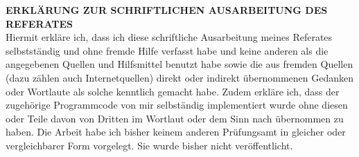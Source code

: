 \clearpage
\thispagestyle{plain}
\textbf{ERKLÄRUNG ZUR SCHRIFTLICHEN AUSARBEITUNG DES REFERATES} \\
Hiermit erkläre ich, dass ich diese schriftliche Ausarbeitung meines Referates selbstständig und ohne fremde Hilfe verfasst habe und keine anderen als die angegebenen Quellen und Hilfsmittel benutzt habe sowie die aus fremden Quellen (dazu zählen auch Internetquellen) direkt oder indirekt übernommenen Gedanken oder Wortlaute als solche kenntlich gemacht habe. Zudem erkläre ich, dass der zugehörige Programmcode von mir selbständig implementiert wurde ohne diesen oder Teile davon von Dritten im Wortlaut oder dem Sinn nach übernommen zu haben. Die Arbeit habe ich bisher keinem anderen Prüfungsamt in gleicher oder vergleichbarer Form vorgelegt. Sie wurde bisher nicht veröffentlicht.

\vspace{1cm}
\noindent\makebox[3cm]{\hrulefill} \hspace{0.1cm}
    \makebox[3cm]{\hrulefill} \hspace{0.1cm}
    \makebox[6cm]{\hrulefill} \\
\noindent{} \hspace{0.1cm}
     \hspace{0.1cm}

\clearpage
